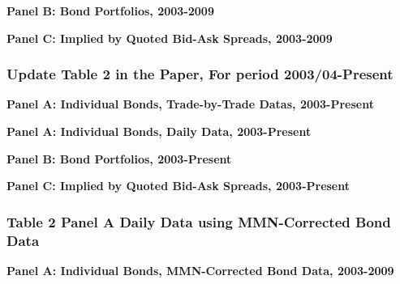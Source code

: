 \documentclass{article}
\newcommand*{\PathToOutput}{../output/}%
\begin{document}
\begin{table}[h]
\centering
\textbf{\large Panel B: Bond Portfolios, 2003-2009}

\label{table:table2_panelB_paper}
\end{table}

\begin{table}[h]
\centering
\textbf{\large Panel C: Implied by Quoted Bid-Ask Spreads, 2003-2009}

\label{table:table2_panelC_paper}
\end{table}


\subsubsection{Update Table 2 in the Paper, For period 2003/04-Present}

\begin{table}[h]
\centering
\textbf{\large Panel A: Individual Bonds, Trade-by-Trade Datas, 2003-Present}
\resizebox{\textwidth}{!}{%
    
}
\label{table:table2_panelA_trade_by_trade_new}
\end{table}

\begin{table}[h]
\centering
\textbf{\large Panel A: Individual Bonds, Daily Data, 2003-Present}
\resizebox{\textwidth}{!}{%
    
}
\label{table:table2_panelA_daily_new}
\end{table}


\begin{table}[h!]
\centering
\textbf{\large Panel B: Bond Portfolios, 2003-Present}
\resizebox{\textwidth}{!}{%
    
}
\label{table:table2_panelB_new}
\end{table}


\begin{table}[h!]
\centering
\textbf{\large Panel C: Implied by Quoted Bid-Ask Spreads, 2003-Present}
\resizebox{\textwidth}{!}{%
    
}
\label{table:table2_panelC_new}
\end{table}


\subsubsection{Table 2 Panel A Daily Data using MMN-Corrected Bond Data}


\begin{table}
\centering
\textbf{\large Panel A: Individual Bonds, MMN-Corrected Bond Data, 2003-2009}

\label{table:table2_panelA_daily_mmn_paper}
\end{table}
\end{document}
